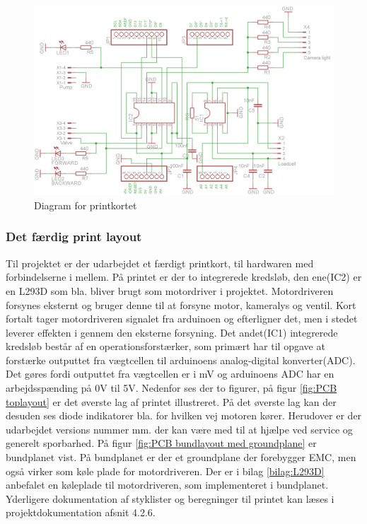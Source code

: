 \begin{figure}[H]
	\centering
	\includegraphics[width=1\textwidth]{billeder/Hovedrapport/Diagram.png}
	\caption{Diagram for printkortet}
	\label{fig:PCBdiagram}
\end{figure}

\newpage

\subsubsection{Det færdig print layout}
Til projektet er der udarbejdet et færdigt printkort, til hardwaren med forbindelserne i mellem. På printet er der to integrerede kredsløb, den ene(IC2) er en L293D som bla. bliver brugt som motordriver i projektet. Motordriveren forsynes eksternt og bruger denne til at forsyne motor, kameralys og ventil. Kort fortalt tager motordriveren signalet fra arduinoen og efterligner det, men i stedet leverer effekten i gennem den eksterne forsyning. Det andet(IC1) integrerede kredsløb består af en operationsforstærker, som primært har til opgave at forstærke outputtet fra vægtcellen til arduinoens analog-digital konverter(ADC). Det gøres fordi outputtet fra vægtcellen er i mV og arduinoens ADC har en arbejdsspænding på 0V til 5V. Nedenfor ses der to figurer, på figur \ref{fig:PCB toplayout} er det øverste lag af printet illustreret. På det øverste lag kan der desuden ses diode indikatorer bla. for hvilken vej motoren kører. Herudover er der udarbejdet versions nummer mm. der kan være med til at hjælpe ved service og generelt sporbarhed. På figur \ref{fig:PCB bundlayout med groundplane} er bundplanet vist. På bundplanet er der et groundplane der forebygger EMC, men også virker som køle plade for motordriveren. Der er i bilag \ref{bilag:L293D} anbefalet en køleplade til motordriveren, som implementeret i bundplanet. Yderligere dokumentation af styklister og beregninger til printet kan læses i projektdokumentation afsnit 4.2.6. 

